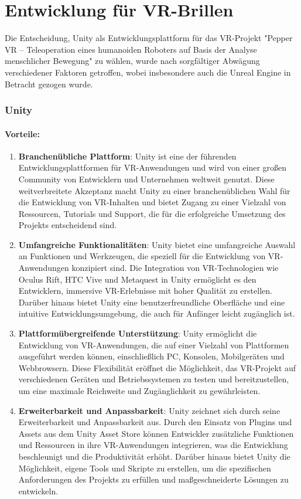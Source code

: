 \section{Entwicklung für VR-Brillen}
Die Entscheidung, Unity als Entwicklungsplattform für das VR-Projekt "Pepper VR – Teleoperation eines humanoiden Roboters auf Basis der Analyse menschlicher Bewegung" zu wählen, wurde nach sorgfältiger Abwägung verschiedener Faktoren getroffen, wobei insbesondere auch die Unreal Engine in Betracht gezogen wurde.

\subsubsection{Unity}

\paragraph{Vorteile:}

\begin{enumerate}
\item \textbf{Branchenübliche Plattform}: Unity ist eine der führenden Entwicklungsplattformen für VR-Anwendungen und wird von einer großen Community von Entwicklern und Unternehmen weltweit genutzt. Diese weitverbreitete Akzeptanz macht Unity zu einer branchenüblichen Wahl für die Entwicklung von VR-Inhalten und bietet Zugang zu einer Vielzahl von Ressourcen, Tutorials und Support, die für die erfolgreiche Umsetzung des Projekts entscheidend sind.
\item \textbf{Umfangreiche Funktionalitäten}: Unity bietet eine umfangreiche Auswahl an Funktionen und Werkzeugen, die speziell für die Entwicklung von VR-Anwendungen konzipiert sind. Die Integration von VR-Technologien wie Oculus Rift, HTC Vive und Metaquest in Unity ermöglicht es den Entwicklern, immersive VR-Erlebnisse mit hoher Qualität zu erstellen. Darüber hinaus bietet Unity eine benutzerfreundliche Oberfläche und eine intuitive Entwicklungsumgebung, die auch für Anfänger leicht zugänglich ist.

\item \textbf{Plattformübergreifende Unterstützung}: Unity ermöglicht die Entwicklung von VR-Anwendungen, die auf einer Vielzahl von Plattformen ausgeführt werden können, einschließlich PC, Konsolen, Mobilgeräten und Webbrowsern. Diese Flexibilität eröffnet die Möglichkeit, das VR-Projekt auf verschiedenen Geräten und Betriebssystemen zu testen und bereitzustellen, um eine maximale Reichweite und Zugänglichkeit zu gewährleisten.

\item \textbf{Erweiterbarkeit und Anpassbarkeit}: Unity zeichnet sich durch seine Erweiterbarkeit und Anpassbarkeit aus. Durch den Einsatz von Plugins und Assets aus dem Unity Asset Store können Entwickler zusätzliche Funktionen und Ressourcen in ihre VR-Anwendungen integrieren, was die Entwicklung beschleunigt und die Produktivität erhöht. Darüber hinaus bietet Unity die Möglichkeit, eigene Tools und Skripte zu erstellen, um die spezifischen Anforderungen des Projekts zu erfüllen und maßgeschneiderte Lösungen zu entwickeln.
\end{enumerate}

